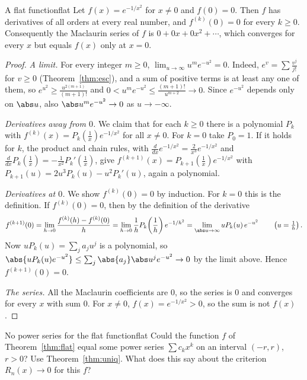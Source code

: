 \documentclass[11pt]{article}
\begin{document}
\begin{thm}{A flat function}{flat}
Let $f(x)=e^{-1/x^2}$ for $x\ne0$ and $f(0)=0$. Then $f$ has derivatives of all orders at every real number, and $f^{(k)}(0)=0$ for every $k\ge0$. Consequently the Maclaurin series of $f$ is $0+0x+0x^2+\cdots$, which converges for every $x$ but equals $f(x)$ only at $x=0$.
\end{thm}
\begin{proof}
\emph{A limit.} For every integer $m\ge0$, $\lim_{u\to\infty}u^me^{-u^2}=0$. Indeed, $e^{v}=\sum\frac{v^j}{j!}$ for $v\ge0$ (Theorem~\ref{thm:esc}), and a sum of positive terms is at least any one of them, so $e^{u^2}\ge\frac{u^{2(m+1)}}{(m+1)!}$ and $0<u^me^{-u^2}\le\frac{(m+1)!}{u^{m+2}}\to0$. Since $e^{-u^2}$ depends only on $\abs u$, also $\abs u^me^{-u^2}\to0$ as $u\to-\infty$.

\emph{Derivatives away from $0$.} We claim that for each $k\ge0$ there is a polynomial $P_k$ with $f^{(k)}(x)=P_k\!\left(\frac1x\right)e^{-1/x^2}$ for all $x\ne0$. For $k=0$ take $P_0=1$. If it holds for $k$, the product and chain rules, with $\frac d{dx}e^{-1/x^2}=\frac2{x^3}e^{-1/x^2}$ and $\frac d{dx}P_k(\frac1x)=-\frac1{x^2}P_k'(\frac1x)$, give $f^{(k+1)}(x)=P_{k+1}\!\left(\frac1x\right)e^{-1/x^2}$ with $P_{k+1}(u)=2u^3P_k(u)-u^2P_k'(u)$, again a polynomial.

\emph{Derivatives at $0$.} We show $f^{(k)}(0)=0$ by induction. For $k=0$ this is the definition. If $f^{(k)}(0)=0$, then by the definition of the derivative
\[
f^{(k+1)}(0)=\lim_{h\to0}\frac{f^{(k)}(h)-f^{(k)}(0)}h=\lim_{h\to0}\frac1hP_k\!\left(\frac1h\right)e^{-1/h^2}=\lim_{\abs u\to\infty}uP_k(u)\,e^{-u^2}\qquad\left(u=\tfrac1h\right).
\]
Now $uP_k(u)=\sum_ja_ju^j$ is a polynomial, so $\abs{uP_k(u)e^{-u^2}}\le\sum_j\abs{a_j}\abs u^je^{-u^2}\to0$ by the limit above. Hence $f^{(k+1)}(0)=0$.

\emph{The series.} All the Maclaurin coefficients are $0$, so the series is $0$ and converges for every $x$ with sum $0$. For $x\ne0$, $f(x)=e^{-1/x^2}>0$, so the sum is not $f(x)$.
\end{proof}

\begin{think}{No power series for the flat function}{flat}
Could the function $f$ of Theorem~\ref{thm:flat} equal some power series $\sum c_kx^k$ on an interval $(-r,r)$, $r>0$? Use Theorem~\ref{thm:uniq}. What does this say about the criterion $R_n(x)\to0$ for this $f$?
\end{think}
\end{document}
